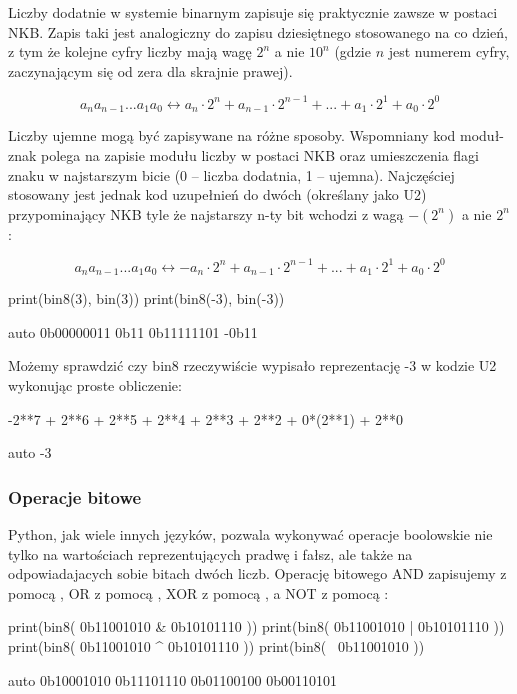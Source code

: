 Liczby dodatnie w systemie binarnym zapisuje się praktycznie zawsze w postaci NKB. Zapis taki jest analogiczny do zapisu dziesiętnego stosowanego na co dzień, z tym że kolejne cyfry liczby mają wagę $2^n$ a nie $10^n$ (gdzie $n$ jest numerem cyfry, zaczynającym się od zera dla skrajnie prawej).

$$ a_{n}a_{n-1}...a_{1}a_{0} \leftrightarrow a_{n} \cdot 2^{n} + a_{n-1} \cdot 2^{n-1} + ... + a_{1} \cdot 2^{1} + a_{0} \cdot 2^{0} $$

Liczby ujemne mogą być zapisywane na różne sposoby.
Wspomniany kod moduł-znak polega na zapisie modułu liczby w postaci NKB oraz umieszczenia flagi znaku w najstarszym bicie (0 – liczba dodatnia, 1 – ujemna).
Najczęściej stosowany jest jednak kod uzupełnień do dwóch (określany jako U2) przypominający NKB tyle że najstarszy n-ty bit wchodzi z wagą $-(2^n)$ a nie $2^n$:

$$ a_{n}a_{n-1}...a_{1}a_{0} \leftrightarrow - a_{n} \cdot 2^{n} + a_{n-1} \cdot 2^{n-1} + ... + a_{1} \cdot 2^{1} + a_{0} \cdot 2^{0} $$

\begin{CodeFrame}[python]{0.55\textwidth}
print(bin8(3),  bin(3))
print(bin8(-3), bin(-3))
\end{CodeFrame}
\begin{CodeFrame}{auto}
0b00000011 0b11
0b11111101 -0b11
\end{CodeFrame}

Możemy sprawdzić czy bin8 rzeczywiście wypisało reprezentację -3 w kodzie U2 wykonując proste obliczenie:

\begin{CodeFrame}[python]{0.75\textwidth}
-2**7 + 2**6 + 2**5 + 2**4 + 2**3 + 2**2 + 0*(2**1) + 2**0
\end{CodeFrame}
\begin{CodeFrame}{auto}
-3
\end{CodeFrame}

\subsubsection{Operacje bitowe}

Python, jak wiele innych języków, pozwala wykonywać operacje boolowskie nie tylko na wartościach reprezentujących pradwę i fałsz, ale także na odpowiadajacych sobie bitach dwóch liczb.
Operację bitowego AND zapisujemy z pomocą \python{&}, OR z pomocą \python{|}, XOR z pomocą \python{^}, a NOT  z pomocą \python{~}:

\begin{CodeFrame}[python]{0.55\textwidth}
print(bin8( 0b11001010 & 0b10101110 ))
print(bin8( 0b11001010 | 0b10101110 ))
print(bin8( 0b11001010 ^ 0b10101110 ))
print(bin8( ~0b11001010 ))
\end{CodeFrame}
\begin{CodeFrame}{auto}
0b10001010
0b11101110
0b01100100
0b00110101
\end{CodeFrame}


